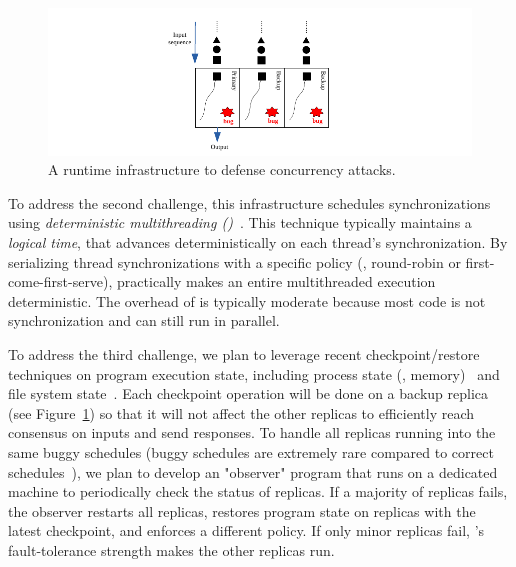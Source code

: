 \begin{figure}[ht]
\centering
\vspace{-.1in}
\includegraphics[width=0.35\columnwidth]{figures/defense}
\vspace{-.05in}
\caption{{A runtime infrastructure to defense concurrency attacks.}} 
\label{fig:defense}
\vspace{-.2in}
\end{figure}





To address the second challenge, this infrastructure schedules synchronizations 
using \emph{deterministic 
multithreading (\dmt)}~\cite{dpj:oopsla09,dmp:asplos09,kendo:asplos09,
coredet:asplos10, 
dos:osdi10,ddos:asplos13,ics:oopsla13}.  This technique typically maintains a 
\emph{logical time}, that advances deterministically on each thread's 
synchronization. By serializing thread synchronizations with a specific policy 
(\eg, round-robin or first-come-first-serve), \dmt practically makes an entire 
multithreaded execution deterministic. The overhead of \dmt is typically 
moderate because most code is not synchronization and can still run in parallel.



To address the third challenge, we plan to leverage recent checkpoint/restore 
techniques on program execution state, including process state (\eg, 
memory)~\cite{criu} and file system state~\cite{lxc}. Each 
checkpoint operation will be done on a backup replica (see 
Figure~\ref{fig:defense}) so that it will not affect the other replicas to 
efficiently reach consensus on inputs and send responses. To handle all replicas 
running into the same buggy schedules (buggy schedules are extremely rare 
compared to correct schedules~\cite{lu:concurrency-bugs}), we plan to develop an 
"observer" program that runs on a dedicated machine to periodically check the 
status of replicas. If a majority of replicas fails, the observer restarts all 
replicas, restores program state on replicas with the latest checkpoint, and 
enforces a different \dmt policy. If only minor replicas fail, \smr's 
fault-tolerance strength makes the other replicas run.

